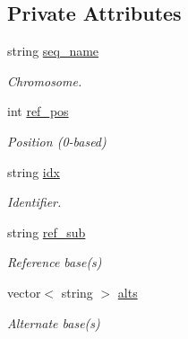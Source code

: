 \subsection*{Private Attributes}
\begin{DoxyCompactItemize}
\item 
\mbox{\label{classVariant_a8fbfaefb028f2b8bf12993b37b40ec95}} 
string \mbox{\hyperlink{classVariant_a8fbfaefb028f2b8bf12993b37b40ec95}{seq\+\_\+name}}
\begin{DoxyCompactList}\small\item\em Chromosome. \end{DoxyCompactList}\item 
\mbox{\label{classVariant_a69abec507721311ca98bb4667e45058e}} 
int \mbox{\hyperlink{classVariant_a69abec507721311ca98bb4667e45058e}{ref\+\_\+pos}}
\begin{DoxyCompactList}\small\item\em Position (0-\/based) \end{DoxyCompactList}\item 
\mbox{\label{classVariant_aafdd01c9a8b70a4a644777069afc4abd}} 
string \mbox{\hyperlink{classVariant_aafdd01c9a8b70a4a644777069afc4abd}{idx}}
\begin{DoxyCompactList}\small\item\em Identifier. \end{DoxyCompactList}\item 
\mbox{\label{classVariant_aa94bd0450be1acdbb6ef597973140b40}} 
string \mbox{\hyperlink{classVariant_aa94bd0450be1acdbb6ef597973140b40}{ref\+\_\+sub}}
\begin{DoxyCompactList}\small\item\em Reference base(s) \end{DoxyCompactList}\item 
\mbox{\label{classVariant_a85f7a8f84a7aff1139cb5fba9876aaac}} 
vector$<$ string $>$ \mbox{\hyperlink{classVariant_a85f7a8f84a7aff1139cb5fba9876aaac}{alts}}
\begin{DoxyCompactList}\small\item\em Alternate base(s) \end{DoxyCompactList}\item 
\mbox{\label{classVariant_a0ce7954e4984243ab59e9237125732fd}} 

\end{DoxyCompactItemize}
